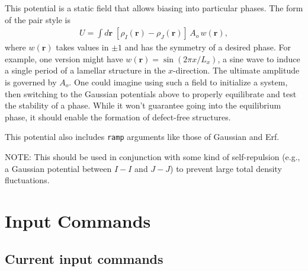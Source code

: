 \documentclass[12pt]{article}
\newcommand{\mb}{\mathbf}
\begin{document}
This potential is a static field that allows biasing into particular phases. The form of the pair style is
\begin{eqnarray}
	U = \int d\mb r
	\;
	[\rho_I(\mb r) - \rho_J(\mb r)] 
	\, A_o \, w(\mb r),
\end{eqnarray}
where $w(\mb r)$ takes values in $\pm 1$ and has the symmetry of a desired phase. For example, one version might have $w(\mb r) = \sin(2\pi x/L_x)$, a sine wave to induce a single period of a lamellar structure in the $x$-direction. The ultimate amplitude is governed by $A_o$. One could imagine using such a field to initialize a system, then switching to the Gaussian potentials above to properly equilibrate and test the stability of a phase. While it won't guarantee going into the equilibrium phase, it should enable the formation of defect-free structures.

This potential also includes \verb+ramp+ arguments like those of Gaussian and Erf.

NOTE: This should be used in conjunction with some kind of self-repulsion (e.g., a Gaussian potential between $I-I$ and $J-J$) to prevent large total density fluctuations.






\pagebreak
\section{Input Commands}

\subsection{Current input commands}
\end{document}
